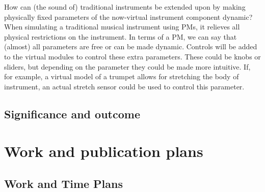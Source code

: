 How can (the sound of) traditional instruments be extended upon by making physically fixed parameters of the now-virtual instrument component dynamic? 
When simulating a traditional musical instrument using PMs, it relieves all physical restrictions on the instrument. In terms of a PM, we can say that (almost) all parameters are free or can be made dynamic. Controls will be added to the virtual modules to control these extra parameters. These could be knobs or sliders, but depending on the parameter they could be made more intuitive. If, for example, a virtual model of a trumpet allows for stretching the body of instrument, an actual stretch sensor could be used to control this parameter.

\subsection{Significance and outcome}

\section{Work and publication plans}
\subsection{Work and Time Plans}

